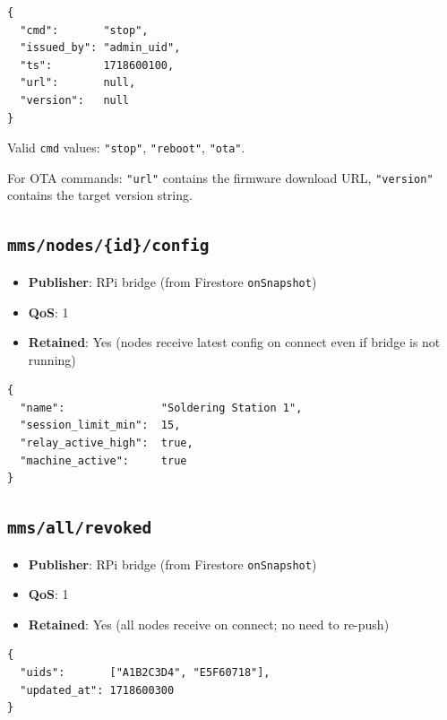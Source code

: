 \begin{lstlisting}[style=jsonlstyle,caption={Command topic payload}]
{
  "cmd":       "stop",
  "issued_by": "admin_uid",
  "ts":        1718600100,
  "url":       null,
  "version":   null
}
\end{lstlisting}

Valid \texttt{cmd} values: \texttt{"stop"}, \texttt{"reboot"}, \texttt{"ota"}.

For OTA commands: \texttt{"url"} contains the firmware download URL, \texttt{"version"} contains the target version string.

\subsection{\texttt{mms/nodes/\{id\}/config}}
\begin{itemize}[leftmargin=1.5em,noitemsep]
    \item \textbf{Publisher}: RPi bridge (from Firestore \texttt{onSnapshot})
    \item \textbf{QoS}: 1
    \item \textbf{Retained}: Yes (nodes receive latest config on connect even if bridge is not running)
\end{itemize}

\begin{lstlisting}[style=jsonlstyle,caption={Config topic payload}]
{
  "name":               "Soldering Station 1",
  "session_limit_min":  15,
  "relay_active_high":  true,
  "machine_active":     true
}
\end{lstlisting}

\subsection{\texttt{mms/all/revoked}}
\begin{itemize}[leftmargin=1.5em,noitemsep]
    \item \textbf{Publisher}: RPi bridge (from Firestore \texttt{onSnapshot})
    \item \textbf{QoS}: 1
    \item \textbf{Retained}: Yes (all nodes receive on connect; no need to re-push)
\end{itemize}

\begin{lstlisting}[style=jsonlstyle,caption={Revocation list topic payload}]
{
  "uids":       ["A1B2C3D4", "E5F60718"],
  "updated_at": 1718600300
}
\end{lstlisting}

